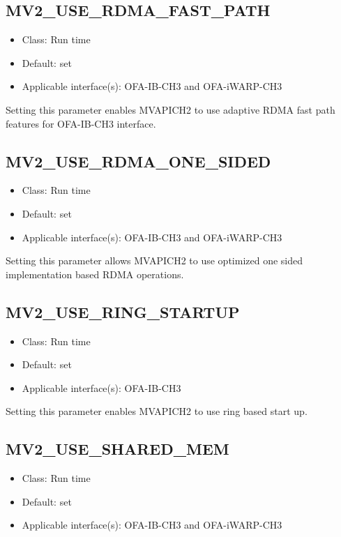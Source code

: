 \subsection{MV2\_USE\_RDMA\_FAST\_PATH}
\label{def:disable-rfp}
\begin{itemize}
    \item Class: Run time
    \item Default: set
    \item Applicable interface(s): OFA-IB-CH3 and OFA-iWARP-CH3
\end{itemize}
Setting this parameter enables MVAPICH2 to use adaptive RDMA fast path features
for OFA-IB-CH3 interface.



\subsection{MV2\_USE\_RDMA\_ONE\_SIDED}
\begin{itemize}
    \item Class: Run time
    \item Default: set
    \item Applicable interface(s): OFA-IB-CH3 and OFA-iWARP-CH3
\end{itemize}
Setting this parameter allows MVAPICH2 to use optimized one sided implementation
based RDMA operations.


\subsection{MV2\_USE\_RING\_STARTUP}
\begin{itemize}
    \item Class: Run time
    \item Default: set
    \item Applicable interface(s): OFA-IB-CH3
\end{itemize}
Setting this parameter enables MVAPICH2 to use ring based start up. 



\subsection{MV2\_USE\_SHARED\_MEM}
\label{def:use-shared-mem}
\begin{itemize}
    \item Class: Run time
    \item Default: set 
    \item Applicable interface(s): OFA-IB-CH3 and OFA-iWARP-CH3
\end{itemize}

